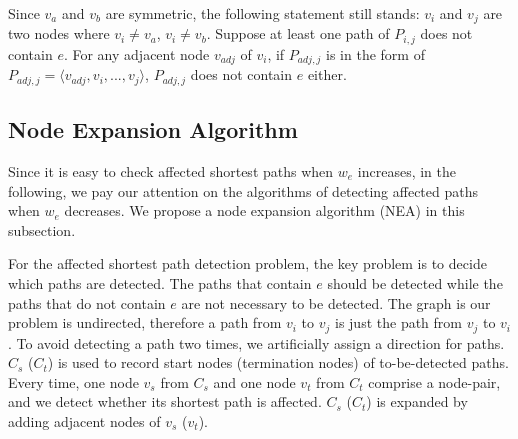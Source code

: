 Since $v_a$ and $v_b$ are symmetric, the following statement still stands: $v_i$ and $v_j$ are two nodes where $v_i\neq v_a$, $v_i\neq v_b$. Suppose at least one path of $P_{i,j}$ does not contain $e$.
For any adjacent node $v_{adj}$ of $v_i$, if $P_{{adj},j}$ is in the form of $P_{adj,j}=\langle v_{adj},v_i,...,v_j\rangle$, $P_{adj,j}$ does not contain $e$ either.
\subsection{Node Expansion Algorithm}
Since it is easy to check affected shortest paths when $w_e$ increases, in the following, we pay our attention on the algorithms of detecting affected paths when $w_e$ decreases.
We propose a node expansion algorithm (NEA) in this subsection.

For the affected shortest path detection problem, the key problem is to decide which paths are detected. The paths that contain $e$ should be detected while the paths that do not contain $e$ are not necessary to be detected.
The graph is our problem is undirected, therefore a path from $v_i$ to $v_j$ is just the path from $v_j$ to $v_i$. To avoid detecting a path two times, we artificially assign a direction for paths.
$C_s$ ($C_t$) is used to record start nodes (termination nodes) of to-be-detected paths.
Every time, one node $v_s$ from $C_s$ and one node $v_t$ from $C_t$ comprise a node-pair, and we detect whether its shortest path is affected. $C_s$ ($C_t$) is expanded by adding adjacent nodes of $v_s$ ($v_t$).

